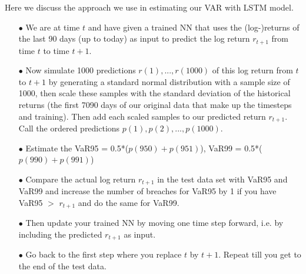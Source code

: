 \documentclass[a4paper,11pt,oneside]{book}
\begin{document}
Here we discuss the approach we use in estimating our VAR with LSTM model. 
\begin{itemize}
	
\item[$\bullet$]   We are at time $t$ and have given a trained NN that uses the (log-)returns of the last 90 days (up to
today) as input to predict the log return $r_{t+1}$ from time $t$ to time $t+1$.
\item[$\bullet$]      Now simulate 1000 predictions $r(1), ..., r(1000)$ of this log return from $t$ to $t+1$ by generating a standard normal distribution with a sample size of 1000, then scale these samples with the standard deviation of the historical returns (the first 7090 days of our original data that make up the timesteps and training). Then add each scaled samples to  our predicted return $r_{t+1}$. Call the ordered
predictions $p(1),p(2),...,p(1000)$.

\item[$\bullet$] Estimate the VaR95 = 0.5*($p(950)+p(951)$), VaR99 = 0.5*($p(990)+p(991)$)


\item[$\bullet$] Compare the actual log return $r_{t+1}$ in the test data set with VaR95 and VaR99 and increase the number
of breaches for VaR95 by 1 if you have VaR95 $>$ $r_{t+1}$ and do the same for VaR99.

\item[$\bullet$] Then update your trained NN by moving one time step forward, i.e. by including the predicted $r_{t+1}$ as input.
\item[$\bullet$] Go back to the first step where you replace $t$ by $t+1$. Repeat till you get to the end of the test data.

\end{itemize}


\end{document}
